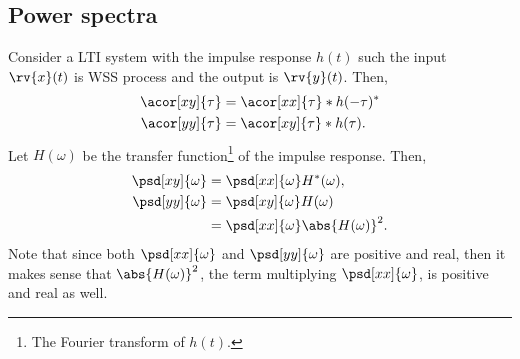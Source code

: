 \subsection{Power spectra}
Consider a LTI system with the impulse response $h(t)$ such the input $\rv{x}(t)$ is WSS process and the output is $\rv{y}(t)$. Then,
\begin{align}
    \acor[xy]{\tau} &= \acor[xx]{\tau}\ast h(-\tau)^{\herm}\\
    \acor[yy]{\tau} &= \acor[xy]{\tau}\ast h(\tau).
\end{align}
Let $H(\omega)$ be the transfer function\footnote{The Fourier transform of $h(t)$.} of the impulse response. Then,
\begin{align}
    \psd[xy]{\omega} &= \psd[xx]{\omega}H^{\herm}(\omega),\\
    \psd[yy]{\omega} &= \psd[xy]{\omega}H(\omega)\\
    &= \psd[xx]{\omega}\abs{ H(\omega)}^{2}.
\end{align}
Note that since both $\psd[xx]{\omega}$ and $\psd[yy]{\omega}$ are positive and real, then it makes sense that $\abs{ H(\omega)}^{2}$, the term multiplying $\psd[xx]{\omega}$, is positive and real as well.